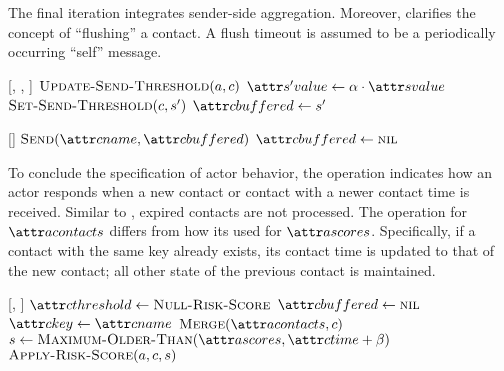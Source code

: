 The final iteration \cApplyRiskScore{} integrates sender-side aggregation. Moreover, \cHandleFlushTimeout{} clarifies the concept of ``flushing'' a contact. A flush timeout is assumed to be a periodically occurring ``self'' message.

\begin{function}{\nApplyRiskScore}[\vActor, \vContact, \vScore]
  \State $\cUpdateSendThreshold[\vActor, \vContact]$
  \If{$\aContactThresholdValue < \aScoreValue \AND \aContactTime + \pTimeBuffer > \aScoreTime$}
    \State $\aNewScoreValue \assign \pTransmissionRate \cdot \aScoreValue$
    \State $\cSetSendThreshold[\vContact, \vNewScore]$
    \If{$\aContactName \notEquals \aScoreSender$}
      \State $\aContactBuffered \assign \vNewScore$
    \EndIf
  \EndIf
\end{function}

\begin{function}{\nHandleFlushTimeout}[\vActor]
  \ForEach{$\vContact \in \aActorContacts$}
    \If{$\aContactBuffered \notEquals \nil$}
      \State $\cSend[\aContactName, \aContactBuffered]$
      \State $\aContactBuffered \assign \nil$
    \EndIf
  \EndFor
\end{function}

To conclude the specification of actor behavior, the \cHandleContact{} operation indicates how an actor responds when a new contact or contact with a newer contact time is received. Similar to \cHandleRiskScore{}, expired contacts are not processed. The \cMerge{} operation for $\aActorContacts$ differs from how its used for $\aActorScores$. Specifically, if a contact with the same key already exists, its contact time is updated to that of the new contact; all other state of the previous contact is maintained.

\begin{function}{\nHandleContact}[\vActor, \vContact]
    \State $\aContactThreshold \assign \cNullRiskScore$
    \State $\aContactBuffered \assign \nil$
    \State $\aContactKey \assign \aContactName$
    \State $\cMerge[\aActorContacts, \vContact]$
    \State $\vScore \assign \cMaximumOlderThan[\aActorScores, \aContactTime + \pTimeBuffer]$
    \State $\cApplyRiskScore[\vActor, \vContact, \vScore]$
  \EndIf
\end{function}



